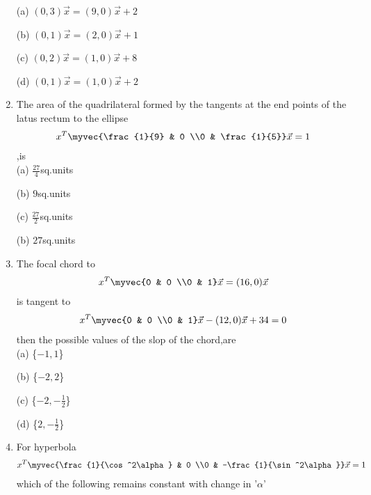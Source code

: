 \begin{enumerate}
    \choice (a) $(0,3)\vec x=(9,0)\vec x+2$
    
    \choice (b) $(0,1)\vec x=(2,0)\vec x+1$
    
    \choice (c) $(0,2)\vec x=(1,0)\vec x+8$
    
    \choice (d) $(0,1)\vec x=(1,0)\vec x+2$\\
    
    \item The area of the quadrilateral formed by the tangents at the end points of the latus rectum to the ellipse \begin{align} x^T \myvec{\frac{1}{9} & 0 \\0 & \frac{1}{5}} \vec x=1\end{align},is\\
    
    \choice (a) $\frac{27}{4}$sq.units
    
    \choice (b) $9$sq.units
    
    \choice (c) $\frac{27}{2}$sq.units
    
    \choice (b) $27$sq.units\\
    
    \item The focal chord to \begin{align} x^T \myvec
    {0 & 0 \\0 & 1}\vec x=(16,0)\vec x\end{align} is tangent to \begin{align} x^T\myvec{0 & 0 \\0 & 1}\vec x-(12,0)\vec x+34=0\end {align} then the possible values of the slop of the chord,are \\
    
    \choice (a) \{${-1,1}$\}
    
    \choice (b) \{${-2,2}$\}
    
    \choice (c) \{${-2,-\frac{1}{2}}$\}
    
    \choice (d) \{${2,-\frac{1}{2}}$\}\\
    
    \item For hyperbola \begin{align} x^T\myvec {\frac{1}{\cos^2\alpha} & 0 \\0 & -\frac{1}{\sin^2\alpha}} \vec x=1\end{align} which of the following remains constant with change in '$\alpha$'\\
    

\end{enumerate}
